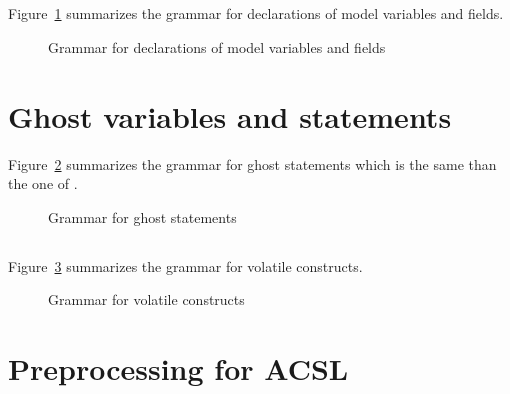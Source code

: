 
\subsection{}
\label{sec:model}

\nodiff

Figure~\ref{fig:gram:model} summarizes the grammar for declarations of model
variables and fields.
\begin{figure}[htbp]
  \caption{Grammar for declarations of model variables and fields}
\label{fig:gram:model}
\end{figure}


\section{Ghost variables and statements}
\label{sec:ghost}

\nodiff

Figure~\ref{fig:gram:ghost} summarizes the grammar for ghost statements which is
the same than the one of \acsl.
\begin{figure}[htbp]
  \caption{Grammar for ghost statements}
\label{fig:gram:ghost}
\end{figure}


\subsection{}
\label{sec:volatile-variables}

Figure~\ref{fig:gram:volatile} summarizes the grammar for volatile constructs.
\begin{figure}[htp]
  \begin{cadre}
      
    \end{cadre}
  \caption{Grammar for volatile constructs}
\label{fig:gram:volatile}
\end{figure}


\section{Preprocessing for ACSL}
\nodiff
